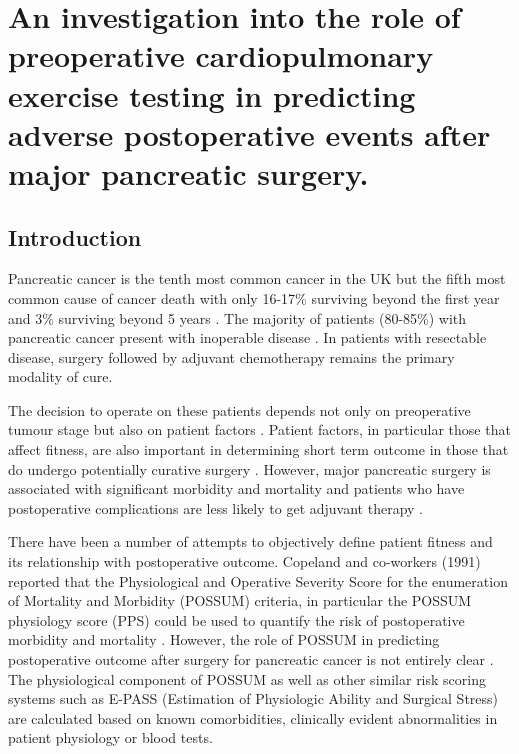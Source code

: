 
\chapter{An investigation into the role of preoperative cardiopulmonary exercise testing in predicting adverse postoperative events after major pancreatic surgery.}
 
\label{ch_cpet_outcomes}
 
\clearpage
 
\section{Introduction}
Pancreatic cancer is the tenth most common cancer in the UK but the fifth most common cause of cancer death with only 16-17\% surviving beyond the first year and 3\% surviving beyond 5 years \parencite{cancerresearchuk_cancer_2014}. 
The majority of patients (80-85\%) with pancreatic cancer present with inoperable disease \parencite{cancerresearchuk_cancer_2014, sener_pancreatic_1999}. 
In patients with resectable disease, surgery \parencite{sener_pancreatic_1999, sohn_resected_2000, geer_prognostic_1993} followed by adjuvant chemotherapy \parencite{neoptolemos_randomized_2004,neoptolemos_adjuvant_2009} remains the primary modality of cure.

The decision to operate on these patients depends not only on preoperative tumour stage but also on patient factors \parencite{bilimoria_national_2007, sandroussi_sociodemographics_2010}. 
Patient factors, in particular those that affect fitness, are also important in determining short term outcome in those that do undergo potentially curative surgery \parencite{mann_review_2010, mayo_management_2012}. 
However, major pancreatic surgery is associated with significant morbidity and mortality and patients who have postoperative complications are less likely to get adjuvant therapy \parencite{teh_patient_2009}.

There have been a number of attempts to objectively define patient fitness and its relationship with postoperative outcome. 
Copeland and co-workers (1991) reported that the Physiological and Operative Severity Score for the enumeration of Mortality and Morbidity (POSSUM) criteria, in particular the POSSUM physiology score (PPS) could be used to quantify the risk of postoperative morbidity and mortality \parencite{copeland_possum:_1991}. 
However, the role of POSSUM in predicting postoperative outcome after surgery for pancreatic cancer is not entirely clear \parencite{de_castro_evaluation_2009, khan_evaluation_2003, kocher_risk-adjustment_2005, pratt_possum_2008, tamijmarane_application_2008}. 
The physiological component of POSSUM as well as other similar risk scoring systems such as E-PASS (Estimation of Physiologic Ability and Surgical Stress)\parencite{haga_estimation_1999} are calculated based on known comorbidities, clinically evident abnormalities in patient physiology or blood tests.

